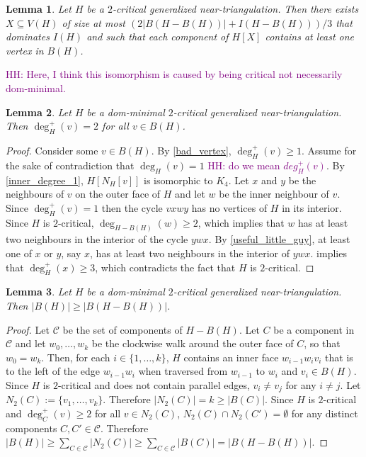\documentclass{article}
\newcommand{\hussein}[1]{\textcolor{purple}{HH: #1}}
\newtheorem{lem}{Lemma}
\theoremstyle{definition}
\begin{document}
\begin{lem}\label{two_critical_handler}
  Let $H$ be a $2$-critical generalized near-triangulation.  Then there exists $X\subseteq V(H)$ of size at most $(2|B(H-B(H))| + I(H-B(H)))/3$ that dominates $I(H)$ and such that each component of $H[X]$ contains at least one vertex in $B(H)$.
\end{lem}

\hussein{Here, I think this isomorphism is caused by being critical not necessarily dom-minimal.}
\begin{lem}
  Let $H$ be a dom-minimal $2$-critical generalized near-triangulation.  Then $\deg^+_H(v)=2$ for all $v\in B(H)$.
\end{lem}

\begin{proof}
  Consider some $v\in B(H)$. By \cref{bad_vertex}, $\deg^+_H(v)\ge 1$. Assume for the sake of contradiction that $\deg_H(v)=1$ \hussein{do we mean $deg_H^+(v)$}. By \cref{inner_degree_1}, $H[N_H[v]]$ is isomorphic to $K_4$. Let $x$ and $y$ be the neighbours of $v$ on the outer face of $H$ and let $w$ be the inner neighbour of $v$. Since $\deg^+_H(v)=1$ then the cycle $vxwy$ has no vertices of $H$ in its interior.  Since $H$ is $2$-critical, $\deg_{H-B(H)}(w)\ge 2$, which implies that $w$ has at least two neighbours in the interior of the cycle $ywx$.  By \cref{useful_little_guy}, at least one of $x$ or $y$, say $x$, has at least two neighbours in the interior of $ywx$.   implies that $\deg^+_H(x)\ge 3$, which contradicts the fact that $H$ is $2$-critical.
\end{proof}


\begin{lem}\label{two_critical_boundary_size}
  Let $H$ be a dom-minimal $2$-critical generalized near-triangulation.  Then $|B(H)|\ge |B(H-B(H))|$.
\end{lem}

\begin{proof}
  Let $\mathcal{C}$ be the set of components of $H-B(H)$.
  Let $C$ be a component in $\mathcal{C}$ and let $w_0,\ldots,w_k$ be the clockwise walk around the outer face of $C$, so that $w_0=w_k$.  Then, for each $i\in\{1,\ldots,k\}$, $H$ contains an inner face $w_{i-1}w_iv_i$ that is to the left of the edge $w_{i-1}w_i$ when traversed from $w_{i-1}$ to $w_i$ and $v_i\in B(H)$.  Since $H$ is $2$-critical and does not contain parallel edges, $v_i\neq v_j$ for any $i\neq j$. Let $N_2(C):=\{v_1,\ldots,v_k\}$.  Therefore $|N_2(C)|= k\ge |B(C)|$. Since $H$ is $2$-critical and $\deg^+_C(v)\ge 2$ for all $v\in N_2(C)$, $N_2(C)\cap N_2(C')=\emptyset$ for any distinct components $C,C'\in\mathcal{C}$.  Therefore $|B(H)|\ge \sum_{C\in\mathcal{C}} |N_2(C)|\ge \sum_{C\in\mathcal{C}} |B(C)|=|B(H-B(H))|$.
\end{proof}
\end{document}
